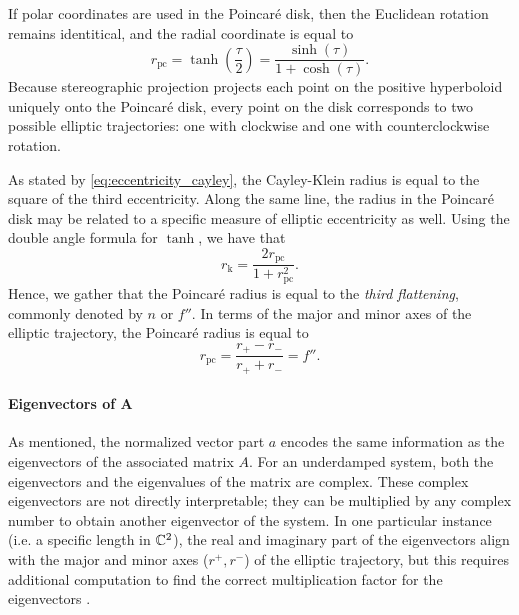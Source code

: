 If polar coordinates are used in the Poincaré disk, then the Euclidean rotation remains identitical, and the radial coordinate is equal to
\begin{equation} 
    r_\text{pc} = \tanh(\frac{\tau}{2}) = \frac{\sinh(\tau)}{1 + \cosh(\tau)}. 
\end{equation}
Because stereographic projection projects each point on the positive hyperboloid uniquely onto the Poincaré disk, every point on the disk corresponds to two possible elliptic trajectories: one with clockwise and one with counterclockwise rotation.

As stated by \cref{eq:eccentricity_cayley}, the Cayley-Klein radius is equal to the square of the third eccentricity. Along the same line, the radius in the Poincaré disk may be related to a specific measure of elliptic eccentricity as well. Using the double angle formula for $ \tanh $, we have that
$$ r_\text{k} = \frac{2r_\text{pc}}{1 + r_\text{pc}^2}. $$
Hence, we gather that the Poincaré radius is equal to the \emph{third flattening}, commonly denoted by $n$ or $f''$. In terms of the major and minor axes of the elliptic trajectory, the Poincaré radius is equal to
$$ r_\text{pc} = \frac{r_+ - r_-}{r_+ + r_-} = f''.$$

\paragraph{Eigenvectors of A} As mentioned, the normalized vector part $a$ encodes the same information as the eigenvectors of the associated matrix $A$. For an underdamped system, both the eigenvectors and the eigenvalues of the matrix are complex. These complex eigenvectors are not directly interpretable; they can be multiplied by any complex number to obtain another eigenvector of the system. In one particular instance (i.e. a specific length in $\mathbb{C}^2$), the real and imaginary part of the eigenvectors align with the major and minor axes ($r^+, r^-$) of the elliptic trajectory, but this requires additional computation to find the correct multiplication factor for the eigenvectors \cite{Edwards2018}. 

